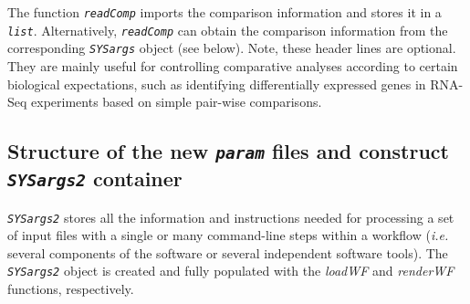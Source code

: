\documentclass[14pt,]{article}
\newcommand{\hlstr}[1]{\textcolor[rgb]{0.251,0.627,0.251}{#1}}%
\newcommand{\hlcom}[1]{\textcolor[rgb]{0.502,0.502,0.502}{\textit{#1}}}%
\newcommand{\hlstd}[1]{\textcolor[rgb]{0.251,0.251,0.251}{#1}}%
\newenvironment{Shaded}{\begin{myshaded}}{\end{myshaded}}
\newcommand{\StringTok}[1]{\hlstr{#1}}
\newcommand{\DocumentationTok}[1]{\hlcom{#1}}
\newcommand{\FunctionTok}[1]{\hlstd{#1}}
\newcommand{\AttributeTok}[1]{{#1}}
\newcommand{\NormalTok}[1]{\hlstd{#1}}
\begin{document}
The function \emph{\texttt{readComp}} imports the comparison information and stores it in a
\emph{\texttt{list}}. Alternatively, \emph{\texttt{readComp}} can obtain the comparison information from
the corresponding \emph{\texttt{SYSargs}} object (see below). Note, these header lines are
optional. They are mainly useful for controlling comparative analyses according
to certain biological expectations, such as identifying differentially expressed
genes in RNA-Seq experiments based on simple pair-wise comparisons.

\begin{Shaded}
\end{Shaded}

\hypertarget{structure-of-the-new-param-files-and-construct-sysargs2-container}{%
\subsection{\texorpdfstring{Structure of the new \emph{\texttt{param}} files and construct \emph{\texttt{SYSargs2}} container}{Structure of the new param files and construct SYSargs2 container}}\label{structure-of-the-new-param-files-and-construct-sysargs2-container}}

\emph{\texttt{SYSargs2}} stores all the information and instructions needed for processing
a set of input files with a single or many command-line steps within a workflow
(\emph{i.e.} several components of the software or several independent software tools).
The \emph{\texttt{SYSargs2}} object is created and fully populated with the \emph{loadWF}
and \emph{renderWF} functions, respectively.
\end{document}
